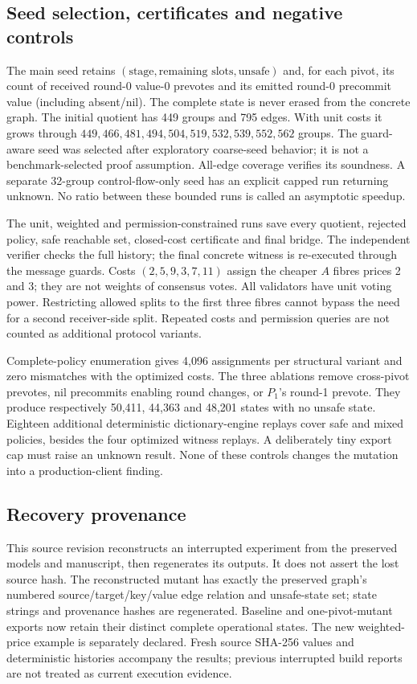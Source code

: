 \subsection{Seed selection, certificates and negative
controls}\label{seed-selection-certificates-and-negative-controls}

The main seed retains
\((\text{stage},\text{remaining slots},\text{unsafe})\) and, for each
pivot, its count of received round-0 value-0 prevotes and its emitted
round-0 precommit value (including absent/nil). The complete state is
never erased from the concrete graph. The initial quotient has 449
groups and 795 edges. With unit costs it grows through
\(449,466,481,494,504,519,532,539,552,562\) groups. The guard-aware seed
was selected after exploratory coarse-seed behavior; it is not a
benchmark-selected proof assumption. All-edge coverage verifies its
soundness. A separate 32-group control-flow-only seed has an explicit
capped run returning unknown. No ratio between these bounded runs is
called an asymptotic speedup.

The unit, weighted and permission-constrained runs save every quotient,
rejected policy, safe reachable set, closed-cost certificate and final
bridge. The independent verifier checks the full history; the final
concrete witness is re-executed through the message guards. Costs
\((2,5,9,3,7,11)\) assign the cheaper \(A\) fibres prices 2 and 3; they
are not weights of consensus votes. All validators have unit voting
power. Restricting allowed splits to the first three fibres cannot
bypass the need for a second receiver-side split. Repeated costs and
permission queries are not counted as additional protocol variants.

Complete-policy enumeration gives 4,096 assignments per structural
variant and zero mismatches with the optimized costs. The three
ablations remove cross-pivot prevotes, nil precommits enabling round
changes, or \(P_1\)'s round-1 prevote. They produce respectively 50,411,
44,363 and 48,201 states with no unsafe state. Eighteen additional
deterministic dictionary-engine replays cover safe and mixed policies,
besides the four optimized witness replays. A deliberately tiny export
cap must raise an unknown result. None of these controls changes the
mutation into a production-client finding.

\subsection{Recovery provenance}\label{recovery-provenance}

This source revision reconstructs an interrupted experiment from the
preserved models and manuscript, then regenerates its outputs. It does
not assert the lost source hash. The reconstructed mutant has exactly
the preserved graph's numbered source/target/key/value edge relation and
unsafe-state set; state strings and provenance hashes are regenerated.
Baseline and one-pivot-mutant exports now retain their distinct complete
operational states. The new weighted-price example is separately
declared. Fresh source SHA-256 values and deterministic histories
accompany the results; previous interrupted build reports are not
treated as current execution evidence.
